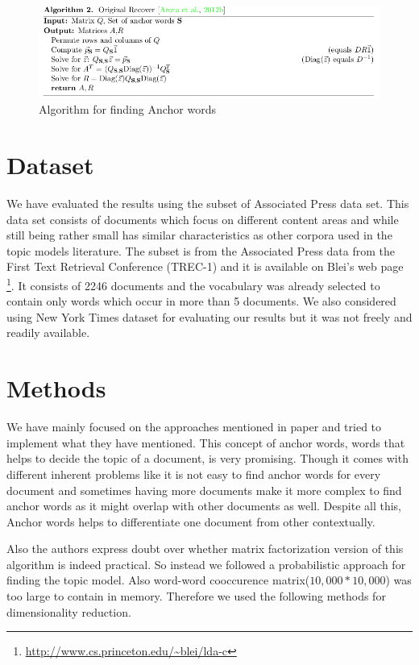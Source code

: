 \documentclass[a4paper,11pt]{article}
\begin{document}
\begin{figure}[htb]
\includegraphics[scale=0.5]{algorithm.png}
\caption{Algorithm for finding Anchor words }
\label{fig:algorithm}
\end{figure}

\section{Dataset}
We have evaluated the results using the subset of Associated Press data set. This data set consists of documents which focus on different content areas and while still being rather small has similar characteristics as other corpora used in the topic models literature. The subset is from the Associated Press data from the First Text Retrieval Conference (TREC-1) and it is available on Blei's web page \footnote{\url{http://www.cs.princeton.edu/~blei/lda-c}}. It consists of 2246 documents and the vocabulary was already selected to contain only words which occur in more than 5 documents. We also considered using New York Times dataset for evaluating our results but it was not freely and readily available.

\section{Methods}
We have mainly focused on the approaches mentioned in paper \cite{tm} and tried to implement what they have mentioned. This concept of anchor words, words that helps to decide the topic of a document, is very promising. Though it comes with different inherent problems like it is not easy to find anchor words for every document and sometimes having more documents make it more complex to find anchor words as it might overlap with other documents as well. Despite all this, Anchor words helps to differentiate one document from other contextually. 

Also the authors express doubt over whether matrix factorization version of this algorithm is indeed practical. So instead we followed a probabilistic approach for finding the topic model. Also word-word cooccurence matrix($10,000*10,000$) was too large to contain in memory. Therefore we used the following methods for dimensionality reduction.
\end{document}
